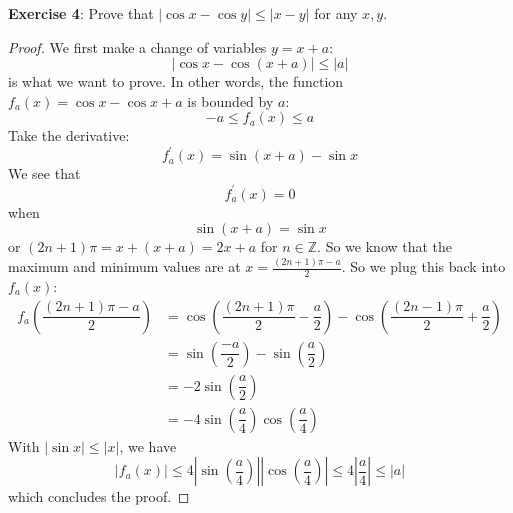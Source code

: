 \documentclass{article}
\begin{document}
\textbf{Exercise 4}: Prove that $\lvert \cos{x} - \cos{y}  \rvert \leq \lvert x - y \rvert$ for any $x, y$.
    \begin{proof}
        We first make a change of variables $y = x + a$:
            \begin{equation*}
                \lvert \cos{x} - \cos{(x + a)} \rvert \leq  \lvert  a \rvert
            \end{equation*}
        is what we want to prove. In other words, the function $f_{a}(x) = \cos{x} - \cos{x + a}$ is bounded by $a$:
            \begin{equation*}
                -a \leq f_{a}(x) \leq a
            \end{equation*}
        Take the derivative:
            \begin{equation*}
                f^{\prime}_{a}(x) = \sin{(x + a)} - \sin{x}
            \end{equation*}
        We see that
            \begin{equation*}
                f^{\prime}_{a}(x) = 0
            \end{equation*}
        when 
            \begin{equation*}
                \sin{(x + a)} = \sin{x}
            \end{equation*}
        or $(2n + 1)\pi = x + (x + a) = 2x + a$ for $n \in \mathbb{ Z}$. So we know that the maximum and minimum values are at $x = \frac{(2n + 1)\pi - a}{2}$. So we plug this back into $f_{a}(x)$:
            \begin{align*}
                f_{a}\left(\dfrac{(2n + 1)\pi - a}{2}\right) &= \cos{\left(\dfrac{(2n + 1)\pi}{2} - \dfrac{a}{2}\right)} - \cos{\left(\dfrac{(2n - 1)\pi}{2} + \dfrac{a}{2}\right)} \\
                                                             &= \sin{\left(\dfrac{-a}{2}\right)} - \sin{\left(\dfrac{a}{2}\right)} \\
                                                             &= -2\sin{\left(\dfrac{a}{2}\right)} \\
                                                             &= -4 \sin{\left(\dfrac{a}{4}\right)} \cos{\left(\dfrac{a}{4}\right)}
            \end{align*}
        With $\lvert \sin{x} \rvert \leq  \lvert  x \rvert$, we have 
            \begin{equation*}
                \lvert f_{a}(x) \rvert \leq  4 \left\lvert \sin{\left(\dfrac{a}{4}\right)} \right\rvert \left\lvert  \cos{\left(\dfrac{a}{4}\right)} \right\rvert \leq  4 \left\lvert \dfrac{a}{4} \right\rvert \leq  \lvert a \rvert
            \end{equation*}
        which concludes the proof.
    \end{proof}
\end{document}
